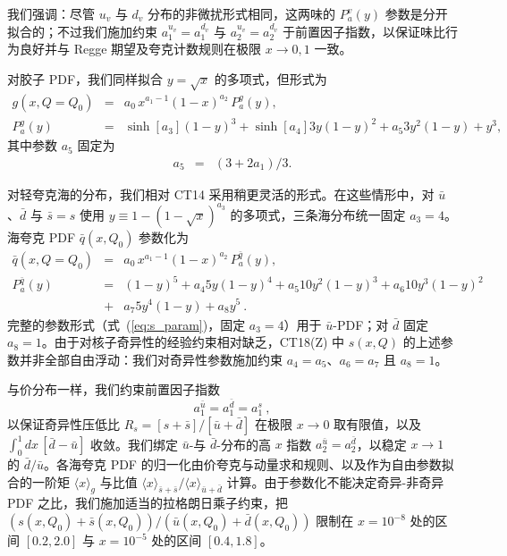 我们强调：尽管 $u_v$ 与 $d_v$ 分布的非微扰形式相同，这两味的 $P^v_a(y)$ 参数是分开拟合的；不过我们施加约束 $a^{u_v}_1\! =\! a^{d_v}_1$ 与
$a^{u_v}_2\! =\! a^{d_v}_2$ 于前置因子指数，以保证味比行为良好并与 Regge 期望及夸克计数规则在极限 $x\! \to\! 0,1$ 一致。

对胶子 PDF，我们同样拟合 $y\! =\! \sqrt{x}$ 的多项式，但形式为
\begin{eqnarray}
g(x,Q=Q_0) &=& a_0\, x^{a_1-1}(1-x)^{a_2}\,P^g_a(y), \\
P^g_a(y) &=& \sinh{[a_3]}         (1-y)^3 +
\sinh{[a_4]}   3 y   (1-y)^2 +
a_5   3 y^2 (1-y)   +
y^3, \nonumber
\end{eqnarray}
其中参数 $a_5$ 固定为
\begin{eqnarray}
a_5 &=& ( 3 + 2 a_1 ) \big/ 3. \label{eq:a5a3}
\end{eqnarray}

对轻夸克海的分布，我们相对 CT14 采用稍更灵活的形式。在这些情形中，对 $\bar{u}$、$\bar{d}$ 与 $\bar{s}=s$ 使用 $y\! \equiv\! 1\! -\! (1\! -\! \sqrt{x})^{a_3}$ 的多项式，三条海分布统一固定 $a_3\! =\! 4$。
海夸克 PDF $\bar{q}(x,Q_0)$ 参数化为
\begin{eqnarray}
\label{eq:s_param}
\bar{q}(x,Q=Q_0) &=& a_0\, x^{a_1-1}(1-x)^{a_2}\,P^{\bar{q}}_a(y), \\
P^{\bar{q}}_a(y) &=&             (1-y)^5 +
a_4   5 y   (1-y)^4 +
a_5  10 y^2 (1-y)^3 +
a_6  10 y^3 (1-y)^2   \nonumber \\
&+& a_7   5 y^4 (1-y)   +
a_8     y^5\ . \nonumber
\end{eqnarray}
完整的参数形式（式~(\ref{eq:s_param})，固定 $a_3 = 4$）用于 $\bar{u}$-PDF；对 $\bar{d}$ 固定 $a_8=1$。由于对核子奇异性的经验约束相对缺乏，CT18(Z) 中 $s(x,Q)$ 的上述参数并非全部自由浮动：我们对奇异性参数施加约束 $a_4\! =\! a_5$、$a_6\! =\! a_7$ 且 $a_8=1$。

与价分布一样，我们约束前置因子指数
\begin{equation}
	a^{\bar{u}}_1 = a^{\bar{d}}_1 = a^s_1\ ,
\label{eq:ubar_exp}
\end{equation}
以保证奇异性压低比 $R_s\! =\! [s+\bar{s}] \big/ [\bar{u}+\bar{d}]$ 在极限 $x\!\to\!0$ 取有限值，以及 $\int^1_0 dx\, [\bar{d}-\bar{u}]$ 收敛。我们绑定 $\bar{u}$-与 $\bar{d}$-分布的高 $x$ 指数 $a^{\bar{u}}_2\! =\! a^{\bar{d}}_2$，以稳定 $x\!\to\!1$ 的 $\bar{d}/\bar{u}$。各海夸克 PDF 的归一化由价夸克与动量求和规则、以及作为自由参数拟合的一阶矩 $\langle x \rangle_{g}$ 与比值 $\langle x\rangle_{\bar s+\bar s}/\langle x\rangle_{\bar u+\bar d}$ 计算。由于参数化不能决定奇异-非奇异 PDF 之比，我们施加适当的拉格朗日乘子约束，把 $\left(s(x,Q_0) + \bar s(x,Q_0)\right)/\left(\bar u(x,Q_0) + \bar d(x,Q_0)\right)$ 限制在 $x=10^{-8}$ 处的区间 $[0.2, 2.0]$ 与 $x=10^{-5}$ 处的区间 $[0.4, 1.8]$。

